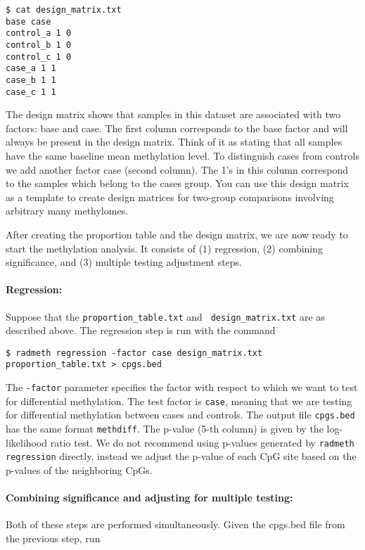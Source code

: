 \documentclass[10pt]{article}
\begin{document}
{\small{%
\begin{verbatim}
$ cat design_matrix.txt
base case
control_a 1 0
control_b 1 0
control_c 1 0
case_a 1 1
case_b 1 1
case_c 1 1
\end{verbatim}%
}}

The design matrix shows that samples in this dataset are associated with two 
factors: base and case. The first column corresponds to the base factor and 
will always be present in the design matrix. Think of it as stating that all 
samples have the same baseline mean methylation level. To distinguish 
cases from controls we add another factor case (second column). The 1's in 
this column correspond to the samples which belong to the cases group. You 
can use this design matrix as a template to create design matrices for 
two-group comparisons involving arbitrary many methylomes.

After creating the proportion table and the design matrix, we are now ready
to start the methylation analysis. It consists of (1) regression, (2)
combining significance, and (3) multiple testing adjustment steps.

\paragraph{Regression:} Suppose that the {\tt proportion\_table.txt} and {\tt 
design\_matrix.txt} are as described above. The regression step is run with 
the command

{\small{%
\begin{verbatim}
$ radmeth regression -factor case design_matrix.txt proportion_table.txt > cpgs.bed
\end{verbatim}%
}}

The {\tt -factor} parameter specifies the factor with respect to which we
want to test for differential methylation. The test factor is {\tt case},
meaning that we are testing for differential methylation between cases and 
controls. The output file {\tt cpgs.bed} has the same format {\tt methdiff}.
The p-value (5-th column) is given by the log-likelihood ratio test. We do
not recommend using p-values generated by {\tt radmeth regression} directly,
instead we adjust the p-value of each CpG site based on the p-values of the
neighboring CpGs.

\paragraph{Combining significance and adjusting for multiple testing:} Both
of these steps are performed simultaneously. Given the cpgs.bed file from 
the previous step, run
\end{document}
